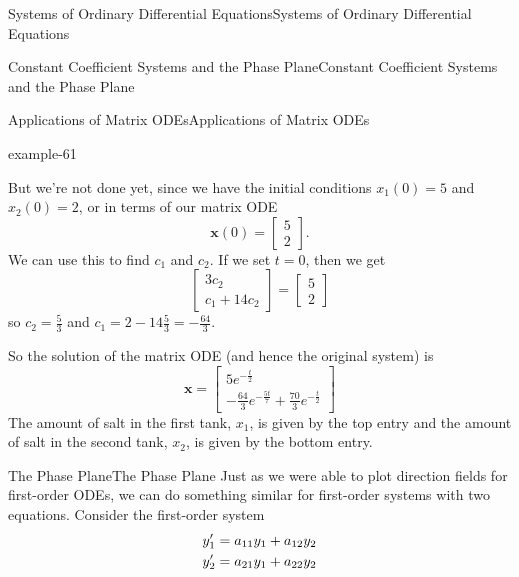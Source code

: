\documentclass[10pt,]{book}
\numberwithin{equation}{section}
\renewcommand{\vec}[1]{\mathbf{#1}}
\newcommand{\amp}{&}
\begin{document}
\begin{chapterptx}{Systems of Ordinary Differential Equations}{}{Systems of Ordinary Differential Equations}{}{}
\begin{sectionptx}{Constant Coefficient Systems and the Phase Plane}{}{Constant Coefficient Systems and the Phase Plane}{}{}
\begin{subsectionptx}{Applications of Matrix ODEs}{}{Applications of Matrix ODEs}{}{}
\begin{example}{}{example-61}
\begin{equation*}
\end{equation*}
%
\par
\hypertarget{p-365}{}%
But we're not done yet, since we have the initial conditions \(x_{1}(0) = 5\) and \(x_{2}(0) = 2\), or in terms of our matrix ODE%
\begin{equation*}
\vec{x}(0) = \begin{bmatrix}5\\2\end{bmatrix}.
\end{equation*}
We can use this to find \(c_{1}\) and \(c_{2}\). If we set \(t=0\), then we get%
\begin{equation*}
\begin{bmatrix}3c_{2} \\ c_{1} + 14c_{2}\end{bmatrix} = \begin{bmatrix}5\\2\end{bmatrix}
\end{equation*}
so \(c_{2} = \frac{5}{3}\) and \(c_{1} = 2 - 14\frac{5}{3} = -\frac{64}{3}\).%
\par
\hypertarget{p-366}{}%
So the solution of the matrix ODE (and hence the original system) is%
\begin{equation*}
\vec{x} = \begin{bmatrix}5e^{-\frac{t}{2}} \\ -\frac{64}{3}e^{-\frac{5t}{7}}+\frac{70}{3}e^{-\frac{t}{2}}\end{bmatrix}
\end{equation*}
The amount of salt in the first tank, \(x_{1}\), is given by the top entry and the amount of salt in the second tank, \(x_{2}\), is given by the bottom entry.%
\end{example}
\end{subsectionptx}
%
%
\typeout{************************************************}
\typeout{************************************************}
%
\begin{subsectionptx}{The Phase Plane}{}{The Phase Plane}{}{}\label{subsection-the-phase-plane}
\hypertarget{p-367}{}%
Just as we were able to plot direction fields for first-order ODEs, we can do something similar for first-order systems with two equations. Consider the first-order system%
\begin{align}
y'_{1}  \amp =  a_{11}y_{1} + a_{12}y_{2}\notag\\
y'_{2}  \amp =  a_{21}y_{1}+  a_{22}y_{2}\notag
\end{align}

\end{subsectionptx}
\end{sectionptx}
\end{chapterptx}
\end{document}
